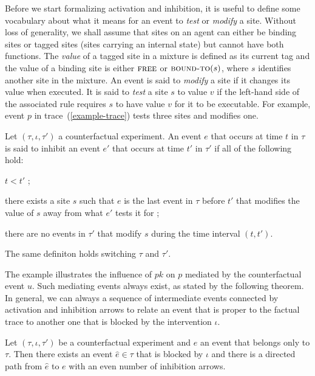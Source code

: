 Before we start formalizing activation and inhibition, it is useful to
define some vocabulary about what it means for an event to \emph{test}
or \emph{modify} a site. Without loss of generality, we shall assume
that sites on an agent can either be binding sites or tagged sites
(sites carrying an internal state) but cannot have both functions. The
\textit{value} of a tagged site in a mixture is defined as its current
tag and the value of a binding site is either $\textsc{free}$ or
$\textsc{bound-to}(s)$, where $s$ identifies another site in the
mixture.  An event is said to \emph{modify} a site if it changes its
value when executed. It is said to \emph{test} a site $s$ to value $v$
if the left-hand side of the associated rule requires $s$ to have
value $v$ for it to be executable. For example, event $p$ in
trace~(\ref{example-trace}) tests three sites and modifies one.



\begin{definition}
  Let $(\tau, \iota, \tau')$ a counterfactual experiment. An
  event $e$ that occurs at time $t$ in $\tau$ is said to inhibit an
  event $e'$ that occurs at time $t'$ in $\tau'$ if all of the
  following hold:
  \begin{inparaenum}[(1)]
  \item \label{inhibition:time} $t < t'$ ;
  \item \label{inhibition:breaks} there exists a site $s$ such that
    $e$ is the last event in $\tau$ before $t'$ that modifies the
    value of $s$ away from what $e'$ tests it for ;
  \item \label{inhibition:nointf} there are no events in $\tau'$ that
    modify $s$ during the time interval $(t, t')$.
  \end{inparaenum}
  The same definiton holds switching $\tau$ and $\tau'$.
\end{definition}


The example illustrates the influence of $pk$ on $p$ mediated by the
counterfactual event $u$. Such mediating events always exist, as
stated by the following theorem.  In general, we can always %
a sequence of intermediate events connected by activation and
inhibition arrows to relate an event that is proper to the factual
trace to another one that is blocked by the intervention $\iota$.

\begin{theorem}\label{thm:completeness} 
  Let $(\tau, \iota, \tau')$ be a counterfactual experiment and $e$ an
  event that belongs only to $\tau$. Then there exists an event
  $\hat e \in \tau$ that is blocked by $\iota$ and there is a directed
  path from $\hat e$ to $e$ with an even number of inhibition arrows.
\end{theorem}
